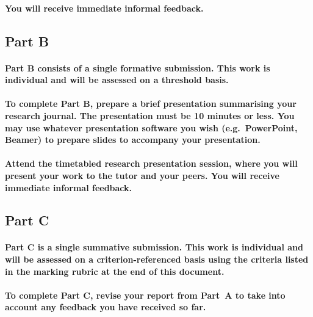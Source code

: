 \documentclass{../../fal_assignment}
\begin{document}
\paragraph{
You will receive \textbf{immediate informal feedback}.
}
 
\subsection*{Part B}

\paragraph{
Part B consists of a \textbf{single formative submission}. This work is \textbf{individual} and will be assessed on a \textbf{threshold} basis.
}

\paragraph{
To complete Part B, prepare a brief presentation summarising your research journal.
The presentation must be \textbf{10 minutes or less}.
You may use whatever presentation software you wish (e.g.\ PowerPoint, Beamer) to prepare slides to accompany your presentation.
}

\paragraph{
Attend the timetabled research presentation session, where you will present your work to the tutor and your peers.
You will receive \textbf{immediate informal feedback}.
}

\subsection*{Part C}

\paragraph{
Part C is a \textbf{single summative submission}. This work is \textbf{individual} and will be assessed on a \textbf{criterion-referenced} basis
using the criteria listed in the marking rubric at the end of this document.
}

\paragraph{
To complete Part C, revise your report from Part~A to take into account any feedback you have received so far.
}
\end{document}
